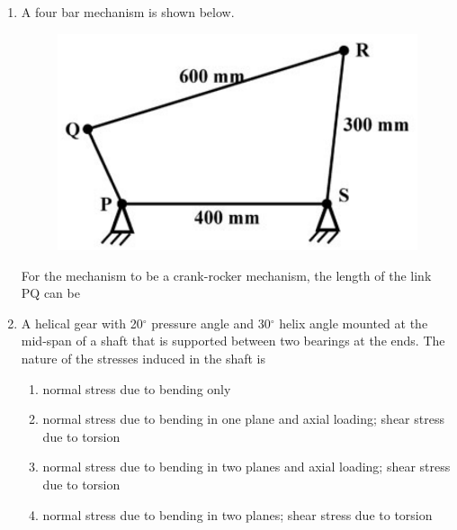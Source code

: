 \documentclass[12pt,onecolumn]{article}
\begin{document}
\begin{enumerate}
    \item A four bar mechanism is shown below.
          \begin{figure}[H]
              \centering
              \includegraphics[scale=0.4]{q8}
              \label{fig:q8}
          \end{figure}
          For the mechanism to be a crank-rocker mechanism, the length of the link PQ can be
          \begin{enumerate}
          \end{enumerate}

    \item A helical gear with 20$^\circ$ pressure angle and 30$^\circ$ helix angle mounted at the mid-span of a shaft that is supported between two bearings at the ends. The nature of the stresses induced in the shaft is
          \begin{enumerate}
              \item normal stress due to bending only
              \item normal stress due to bending in one plane and axial loading; shear stress due to torsion
              \item normal stress due to bending in two planes and axial loading; shear stress due to torsion
              \item normal stress due to bending in two planes; shear stress due to torsion
          \end{enumerate}


\end{enumerate}
\end{document}
